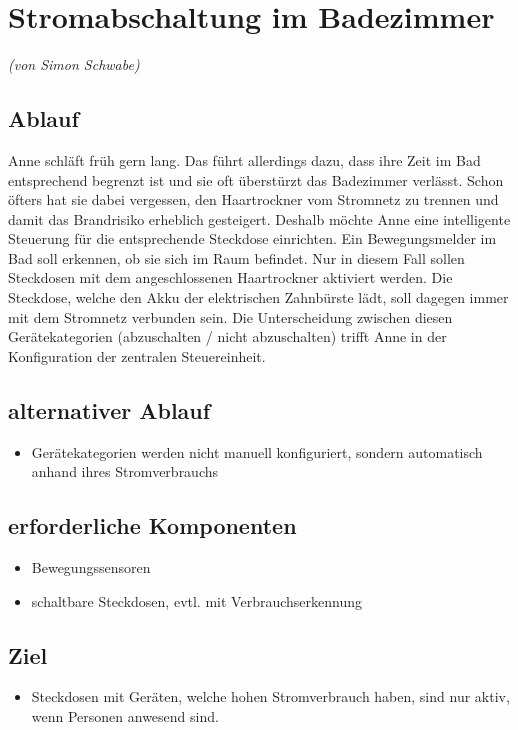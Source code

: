 \section{Stromabschaltung im Badezimmer}
\emph{(von Simon Schwabe)}
\subsection{Ablauf}
Anne schläft früh gern lang. Das führt allerdings dazu, dass ihre Zeit im Bad entsprechend begrenzt ist und sie oft überstürzt das Badezimmer verlässt. Schon öfters hat sie dabei vergessen, den Haartrockner vom Stromnetz zu trennen und damit das Brandrisiko erheblich gesteigert.
Deshalb möchte Anne eine intelligente Steuerung für die entsprechende Steckdose einrichten. Ein Bewegungsmelder im Bad soll erkennen, ob sie sich im Raum befindet. Nur in diesem Fall sollen Steckdosen mit dem angeschlossenen Haartrockner aktiviert werden. Die Steckdose, welche den Akku der elektrischen Zahnbürste lädt, soll dagegen immer mit dem Stromnetz verbunden sein.
Die Unterscheidung zwischen diesen Gerätekategorien (abzuschalten / nicht abzuschalten) trifft Anne in der Konfiguration der zentralen Steuereinheit.

\subsection{alternativer Ablauf}
\begin{itemize}
	\item Gerätekategorien werden nicht manuell konfiguriert, sondern automatisch anhand ihres Stromverbrauchs 
\end{itemize}

\subsection{erforderliche Komponenten}
\begin{itemize}
	\item Bewegungssensoren
	\item schaltbare Steckdosen, evtl. mit Verbrauchserkennung
\end{itemize} 

\subsection{Ziel}
\begin{itemize}
	\item Steckdosen mit Geräten, welche hohen Stromverbrauch haben, sind nur aktiv, wenn Personen anwesend sind.
\end{itemize}

